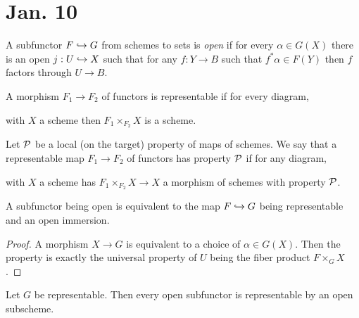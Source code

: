 \documentclass[12pt]{article}
\begin{document}
\section{Jan. 10}

\begin{defn}
A subfunctor $F \hookrightarrow G$ from schemes to sets is \textit{open} if for every $\alpha \in G(X)$ there is an open $j : U \hookrightarrow X$ such that for any $f : Y \to B$ such that $f^* \alpha \in F(Y)$ then $f$ factors through $U \to B$.
\end{defn}

\begin{defn}
A morphism $F_1 \to F_2$ of functors is representable if for every diagram,
\begin{center}
\end{center}
with $X$ a scheme then $F_1 \times_{F_2} X$ is a scheme.
\end{defn}

\begin{defn}
Let $\mathcal{P}$ be a local (on the target) property of maps of schemes. We say that a representable map $F_1 \to F_2$ of functors has property $\mathcal{P}$ if for any diagram,
\begin{center}
\end{center}
with $X$ a scheme has $F_1 \times_{F_2} X \to X$ a morphism of schemes with property $\mathcal{P}$.
\end{defn}

\begin{prop}
A subfunctor being open is equivalent to the map $F \hookrightarrow G$ being representable and an open immersion.
\end{prop}

\begin{proof}
A morphism $X \to G$ is equivalent to a choice of $\alpha \in G(X)$. Then the property is exactly the universal property of $U$ being the fiber product $F \times_G X$. 
\end{proof}

\begin{prop}
Let $G$ be representable. Then every open subfunctor is representable by an open subscheme.
\end{prop}
\end{document}
